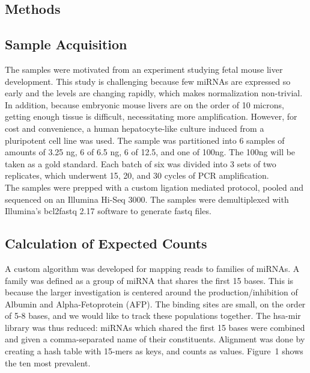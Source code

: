 \documentclass{bioinfo}
\begin{document}
\begin{methods}
\section{Methods}
\subsection{Sample Acquisition}
The samples were motivated from an experiment studying fetal mouse liver development. This study is challenging because few miRNAs are expressed so early and the levels are changing rapidly, which makes normalization non-trivial. In addition, because embryonic mouse livers are on the order of 10 microns, getting enough tissue is difficult, necessitating more amplification.\citep{Xu10}  However, for cost and convenience, a human hepatocyte-like culture induced from a pluripotent cell line was used. The sample was partitioned into 6 samples of amounts of 3.25 ng, 6 of 6.5 ng, 6 of 12.5, and one of 100ng. The 100ng will be taken as a gold standard. Each batch of six was divided into 3 sets of two replicates, which underwent 15, 20, and 30 cycles of PCR amplification.\vspace{4pt} \\  
The samples were prepped with a custom ligation mediated protocol, pooled and sequenced on an Illumina Hi-Seq 3000.  The samples were demultiplexed with Illumina's bcl2fastq 2.17 software to generate fastq files. 
\subsection{Calculation of Expected Counts}
A custom algorithm was developed for mapping reads to families of miRNAs. A family was defined as a group of miRNA that shares the first 15 bases. This is because the larger investigation is centered around the production/inhibition of Albumin and Alpha-Fetoprotein (AFP). The binding sites are small, on the order of 5-8 bases, and we would like to track these populations together. The hsa-mir library was thus reduced: miRNAs which shared the first 15 bases were combined and given a comma-separated name of their constituents.  Alignment was done by creating a hash table with 15-mers as keys, and counts as values.
Figure~1 \vphantom{\ref{fig:1}} shows the ten most prevalent. \\


\end{methods}
\end{document}

